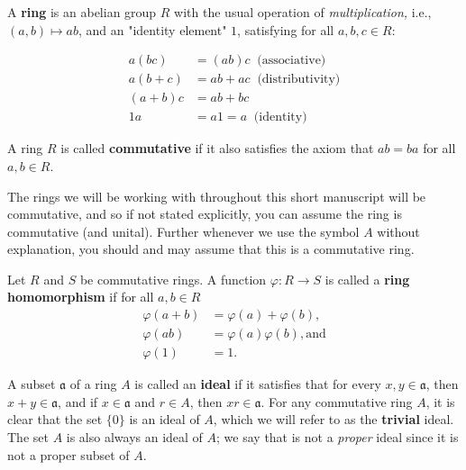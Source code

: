 \documentclass[graybox, reqno]{svmono}
\newcommand{\ideala}{\mathfrak{a}}
\begin{document}
\begin{definition}
A \textbf{ring} is an abelian group $R$ with the usual operation of \textit{multiplication,} i.e., $(a, b) \mapsto ab$, and an "identity element" $1$, satisfying for all $a, b, c \in R$:

\begin{align*}
a(bc) &= (ab)c \; \; \text{(associative)} \\
a(b+c) &= ab + ac \; \; \text{(distributivity)} \\ 
(a+b)c &= ab + bc\\
1a &= a1 = a \; \; \text{(identity)}
\end{align*}
\end{definition}

\begin{definition} A ring $R$ is called \textbf{commutative} if it also satisfies the axiom that $ab = ba$ for all $a, b \in R$. 
\end{definition}


The rings we will be working with throughout this short manuscript will be commutative, and so if not stated explicitly, you can assume the ring is commutative (and unital). Further whenever we use the symbol $A$ without explanation, you should and may assume that this is a commutative ring. 

\begin{definition} Let $R$ and $S$ be commutative rings. A function $\varphi \colon R \to S$ is called a \textup{\textbf{ring homomorphism}} if for all $a, b \in R$
\begin{align*}
\varphi(a+b) &= \varphi(a) + \varphi(b), \\
\varphi(ab) &= \varphi(a) \varphi(b), \text{and} \\
\varphi (1) &= 1.
\end{align*}
\end{definition}

A subset $\ideala$ of a ring $A$ is called an \textbf{ideal} if it satisfies that for every $x, y\in \ideala$, then $x+y \in \ideala$, and if $x \in \ideala$ and $r \in A$, then $xr \in \ideala$.  For any commutative ring $A$, it is clear that the set $\{ 0 \}$ is an ideal of $A$, which we will refer to as the \textup{\textbf{trivial}} ideal. The set $A$ is also always an ideal of $A$; we say that is not a \textit{proper} ideal since it is not a proper subset of $A$. 
\end{document}
